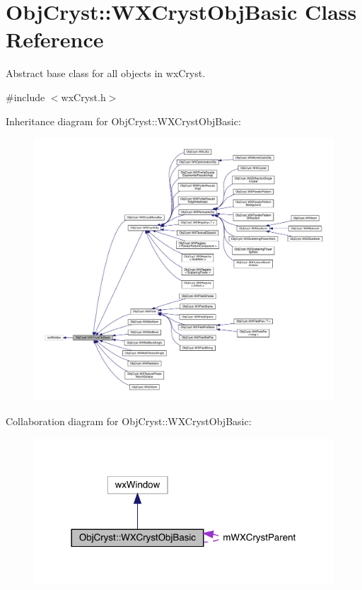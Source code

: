 \hypertarget{class_obj_cryst_1_1_w_x_cryst_obj_basic}{}\section{Obj\+Cryst\+::W\+X\+Cryst\+Obj\+Basic Class Reference}
\label{class_obj_cryst_1_1_w_x_cryst_obj_basic}


Abstract base class for all objects in wx\+Cryst.  




{\ttfamily \#include $<$wx\+Cryst.\+h$>$}



Inheritance diagram for Obj\+Cryst\+::W\+X\+Cryst\+Obj\+Basic\+:
\nopagebreak
\begin{figure}[H]
\begin{center}
\leavevmode
\includegraphics[width=350pt]{class_obj_cryst_1_1_w_x_cryst_obj_basic__inherit__graph}
\end{center}
\end{figure}


Collaboration diagram for Obj\+Cryst\+::W\+X\+Cryst\+Obj\+Basic\+:
\nopagebreak
\begin{figure}[H]
\begin{center}
\leavevmode
\includegraphics[width=318pt]{class_obj_cryst_1_1_w_x_cryst_obj_basic__coll__graph}
\end{center}
\end{figure}
